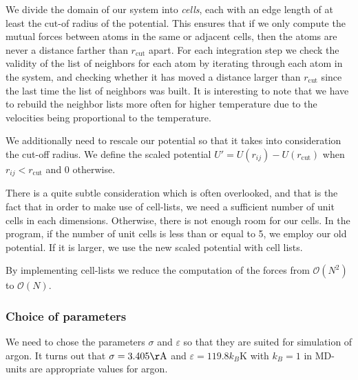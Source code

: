 \documentclass[a4paper]{article}
\begin{document}
    We divide the domain of our system into \emph{cells}, each with an edge
    length of at least the cut-of radius of the potential. This ensures that if
    we only compute the mutual forces between atoms in the same or adjacent
    cells, then the atoms are never a distance farther than $r_\mathrm{cut}$
    apart. For each integration step we check the validity of the list of
    neighbors for each atom by iterating through each atom in the system, and
    checking whether it has moved a distance larger than $r_\mathrm{cut}$ since
    the last time the list of neighbors was built. It is interesting to note
    that we have to rebuild the neighbor lists more often for higher
    temperature due to the velocities being proportional to the temperature.
   
    We additionally need to rescale our potential so that it takes into
    consideration the cut-off radius. We define the scaled potential $U' =
    U(r_{ij}) - U(r_\mathrm{cut})$ when $r_{ij} < r_\mathrm{cut}$ and 0
    otherwise.
    
    There is a quite subtle consideration which is often overlooked, and that
    is the fact that in order to make use of cell-lists, we need a sufficient
    number of unit cells in each dimensions. Otherwise, there is not enough
    room for our cells.  In the program, if the number of unit cells is less
    than or equal to 5, we employ our old potential. If it is larger, we use
    the new scaled potential with cell lists.

    By implementing cell-lists we reduce the computation of the forces from
    $\mathcal{O}(N^2)$ to $\mathcal{O}(N)$. 
   
    \subsubsection{Choice of parameters}
    \label{ssub:choice_of_parameters}
    
    We need to chose the parameters $\sigma$ and $\varepsilon$ so that they are
    suited for simulation of argon. It turns out that $\sigma = 3.405
    \mathrm{\AA}$ and $\varepsilon = 119.8k_B\mathrm{K}$ with $k_B = 1$ in
    MD-units are appropriate values for argon.
\end{document}

